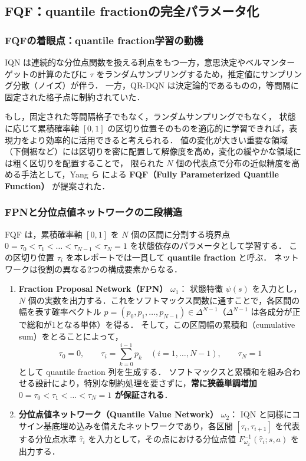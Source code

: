 \documentclass[a4paper,10pt]{jsarticle}
\theoremstyle{definition}
\renewcommand{\Finv}{F^{-1}}
\begin{document}
\subsection{FQF：quantile fractionの完全パラメータ化}
\label{subsec:fqf}

\subsubsection{FQFの着眼点：quantile fraction学習の動機}
IQN は連続的な分位点関数を扱える利点をもつ一方，意思決定やベルマンターゲットの計算のたびに $\tau$ をランダムサンプリングするため，推定値にサンプリング分散（ノイズ）が伴う．
一方，QR-DQN は決定論的であるものの，等間隔に固定された格子点に制約されていた．

もし，固定された等間隔格子でもなく，ランダムサンプリングでもなく，
状態に応じて累積確率軸 $[0, 1]$ の区切り位置そのものを適応的に学習できれば，表現力をより効率的に活用できると考えられる．
値の変化が大きい重要な領域（下側裾など）には区切りを密に配置して解像度を高め，変化の緩やかな領域には粗く区切りを配置することで，
限られた $N$ 個の代表点で分布の近似精度を高める手法として，Yang ら \cite{yang2019fqf} による \textbf{FQF（Fully Parameterized Quantile Function）} が提案された．

\subsubsection{FPNと分位点値ネットワークの二段構造}
FQF は，累積確率軸 $[0, 1]$ を $N$ 個の区間に分割する境界点 $0 = \tau_0 < \tau_1 < \dots < \tau_{N-1} < \tau_N = 1$ を状態依存のパラメータとして学習する．
この区切り位置 $\tau_i$ を本レポートでは一貫して \textbf{quantile fraction} と呼ぶ．
ネットワークは役割の異なる2つの構成要素からなる．

\begin{enumerate}
  \item \textbf{Fraction Proposal Network（FPN）} $\omega_1$：
  状態特徴 $\psi(s)$ を入力とし，$N$ 個の実数を出力する．これをソフトマックス関数に通すことで，各区間の幅を表す確率ベクトル $p = (p_0, p_1, \dots, p_{N-1}) \in \Delta^{N-1}$（$\Delta^{N-1}$ は各成分が正で総和が1となる単体）を得る．
  そして，この区間幅の累積和（cumulative sum）をとることによって，
  \begin{equation}
    \tau_0 = 0,\qquad \tau_i = \sum_{k=0}^{i-1} p_k\quad (i=1,\dots,N-1),\qquad \tau_N = 1
    \label{eq:fpn-cumsum}
  \end{equation}
  として quantile fraction 列を生成する．
ソフトマックスと累積和を組み合わせる設計により，特別な制約処理を要さずに，\textbf{常に狭義単調増加 $0 = \tau_0 < \tau_1 < \dots < \tau_N = 1$ が保証される}．

  \item \textbf{分位点値ネットワーク（Quantile Value Network）} $\omega_2$：
  IQN と同様にコサイン基底埋め込みを備えたネットワークであり，各区間 $[\tau_i, \tau_{i+1}]$ を代表する分位点水準 $\hat\tau_i$ を入力として，その点における分位点値 $\Finv_{\omega_2}(\hat\tau_i; s, a)$ を出力する．
\end{enumerate}
\end{document}
